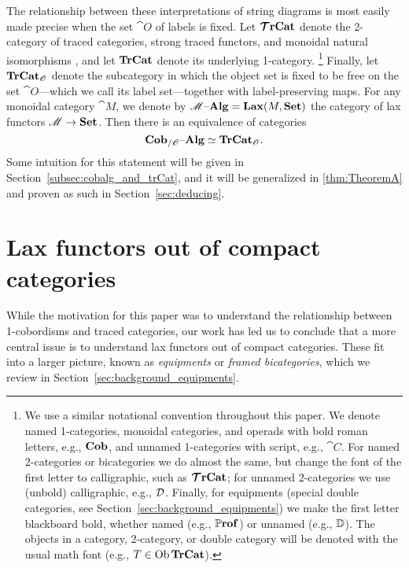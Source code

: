 \documentclass[12pt,oneside,article,draft]{memoir}
\begin{document}
The relationship between these interpretations of string diagrams is most easily made precise when
the set $\cat{O}$ of labels is fixed. Let $\bm{\mathcal{T}}\mathbf{rCat}$ denote the 2-category of traced categories,
strong traced functors, and monoidal natural isomorphisms \cite{HK}, and let $\mathbf{TrCat}$ denote its
underlying 1-category.%
\footnote{
   We use a similar notational convention throughout this paper. We denote named 1-categories,
   monoidal categories, and operads with bold roman letters, e.g., $\mathbf{Cob}$, and unnamed
   1-categories with script, e.g., $\cat{C}$. For named 2-categories or bicategories we do almost
   the same, but change the font of the first letter to calligraphic, such as $\bm{\mathcal{T}}\mathbf{rCat}$; for
   unnamed 2-categories we use (unbold) calligraphic, e.g., $\mathcal{D}$. Finally, for equipments
   (special double categories, see Section~\ref{sec:background_equipments}) we make the first letter
   blackboard bold, whether named (e.g., $\mathbb{P}\mathbf{rof}$) or unnamed (e.g., $\mathbb{D}$). The
   objects in a category, 2-category, or double category will be denoted with the usual math font
   (e.g., $T\in\operatorname{Ob}\mathbf{TrCat}$).
}
Finally, let $\mathbf{TrCat}_{\mathscr{O}}$ denote the subcategory in which the object set is fixed to be free
on the set $\cat{O}$---which we call its label set---together with label-preserving maps. For any
monoidal category $\cat{M}$, we denote by $\mathscr{M}{\text \textendash}\mathbf{Alg}=\mathbf{Lax}(M,\mathbf{Set})$ the category of lax
functors $\mathscr{M}\to\mathbf{Set}$. Then there is an equivalence of categories
\begin{equation}\label{eq:single_fiber}
   \mathbf{Cob}_{/\mathscr{O}}{\text \textendash}\mathbf{Alg}\simeq\mathbf{TrCat}_{\mathscr{O}}.
\end{equation}
Some intuition for this statement will be given in Section~\ref{subsec:cobalg_and_trCat}, and it
will be generalized in \ref{thm:TheoremA} and proven as such in Section~\ref{sec:deducing}.

\section{Lax functors out of compact categories}\label{subsec:main_results}

While the motivation for this paper was to understand the relationship between 1-cobordisms and traced categories, our work has led us to conclude that a more central issue is to understand lax functors out of compact categories. These fit into a larger picture, known as \emph{equipments} or \emph{framed bicategories}, which we review in Section~\ref{sec:background_equipments}. 
\end{document}

